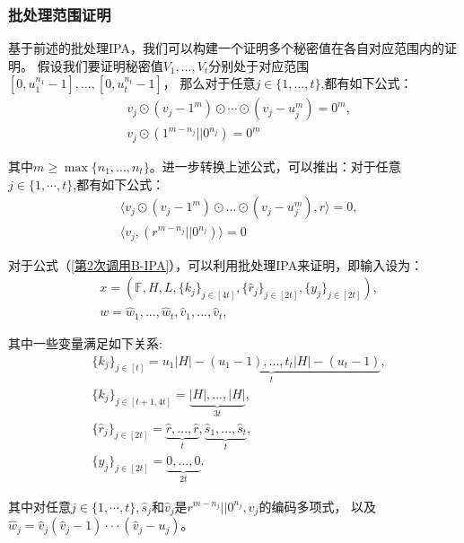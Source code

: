 \documentclass[zihao=-4]{ctexart}
\begin{document}
\begin{spacing}{1.5}
\subsubsection{批处理范围证明}
基于前述的批处理IPA，我们可以构建一个证明多个秘密值在各自对应范围内的证明。
假设我们要证明秘密值$V_1,...,V_t$分别处于对应范围$[0,u_1^{n_1}-1],...,[0,u_t^{n_t}-1]$，
那么对于任意$j \in \{1,\ldots,t\}$,都有如下公式：
\begin{equation}\begin{aligned}&v_j\odot(v_j-1^m)\odot\cdots\odot(v_j-u_j^m)=0^m,\\&v_j\odot(1^{m-n_j}||0^{n_j})=0^m\end{aligned}\end{equation}\par
其中$m\ge\max\{n_1,...,n_t\}$。进一步转换上述公式，可以推出：对于任意$j \in \{1,\cdots,t\}$,都有如下公式：
\begin{equation}\begin{aligned}
&\langle v_j\odot(v_j-1^m)\odot...\odot(v_j-u_j^m),r\rangle=0,\\
&\langle v_j,(r^{m-n_j}||0^{n_j})\rangle=0\label{第2次调用B-IPA}
\end{aligned}\end{equation}\par
对于公式（\ref{第2次调用B-IPA}），可以利用批处理IPA来证明，即输入设为：
\begin{equation}\begin{aligned}
&x=(\mathbb{F},H,L,\{k_j\}_{j \in [4t]},\{\hat{r}_j\}_{j\in [2t]},\{y_j\}_{j \in [2t]}),\\
&w=\hat{w}_1,...,\hat{w}_t,\hat{v}_1,...,\hat{v}_t,
\end{aligned}\end{equation}\par
其中一些变量满足如下关系:
\begin{equation}\begin{aligned}
&\{k_j\}_{j\in [t]}=\underbrace{u_1|H|-(u_1-1),...,t_t|H|-(u_t-1)}_t,\\
&\{k_j\}_{j\in [t+1,4t]}=\underbrace{|H|,...,|H|}_{3t},\\
&\{\hat{r}_j\}_{j\in [2t]}=\underbrace{\hat{r},...,\hat{r}}_t,\underbrace{\hat{s}_1,...,\hat{s}_t}_t,\\
&\{y_j\}_{j\in [2t]}=\underbrace{0,...,0}_{2t}.
\end{aligned}\end{equation}\par
其中对任意$j\in \{1,\cdots,t\},\hat{s}_j$和$\hat{v}_j$是$r^{m-n_j}||0^{n_j},v_j$的编码多项式，
以及$\hat{w}_j=\hat{v}_j(\hat{v}_j-1)\cdot\cdot\cdot(\hat{v}_j-u_j)$。\par

\end{spacing}
\end{document}
